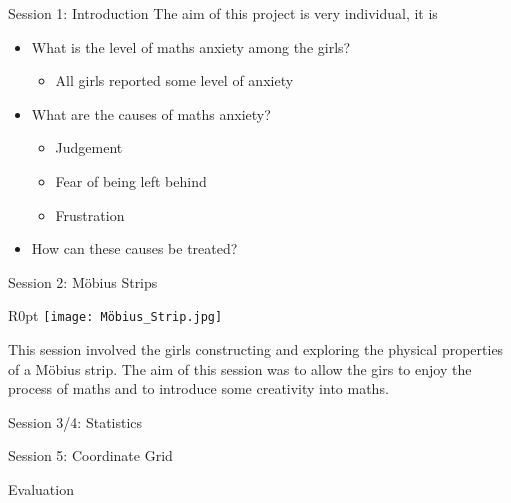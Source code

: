 \documentclass{beamer}  %
\begin{document}


\begin{frame}{Session 1: Introduction}
    The aim of this project is very individual, it is 
    \begin{itemize}
        \item What is the level of maths anxiety among the girls?
        \begin{itemize}
            \item[-]All girls reported some level of anxiety
        \end{itemize}
        \item What are the causes  of maths anxiety?
        \begin{itemize}
            \item[-] Judgement
            \item[-] Fear of being left behind
            \item[-] Frustration
        \end{itemize}
        \item How can these causes be treated?
    \end{itemize}
\end{frame}

\begin{frame}{Session 2: M\"{o}bius Strips}
    \begin{wrapfigure}{R}{0pt}
        \texttt{[image: Möbius\_Strip.jpg]}
        \caption{M\"{o}bius Strip}
    \end{wrapfigure}
    This session involved the girls constructing and exploring the physical properties of a M\"{o}bius strip. The aim of this session was to allow the girs to enjoy the process of maths and to introduce some creativity into maths.
\end{frame}

\begin{frame}{Session 3/4: Statistics}

\end{frame}

\begin{frame}{Session 5: Coordinate Grid}

\end{frame}


\begin{frame}{Evaluation}

\end{frame}
\end{document}
